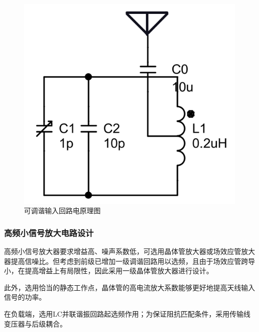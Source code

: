 \documentclass[a4paper,12pt,twoside]{article}
\begin{document}
  \begin{figure}[H]
        \centering
        \includegraphics[scale=0.1]{输入头.png}
        \caption{可调谐输入回路电原理图}
        \label{输入头}
    \end{figure}




\subsubsection{高频小信号放大电路设计}
高频小信号放大器要求增益高、噪声系数低，可选用晶体管放大器或场效应管放大器提高信噪比。但考虑到前级已增加一级调谐回路用以选频，且由于场效应管跨导小，在提高增益上有局限性，因此采用一级晶体管放大器进行设计。

此外，选用恰当的静态工作点，晶体管的高电流放大系数能够更好地提高天线输入信号的功率。

在负载端，选用LC并联谐振回路起选频作用；为保证阻抗匹配条件，采用传输线变压器与后级耦合\cite{罗伟雄2003调频收音机评述}。
\end{document}

